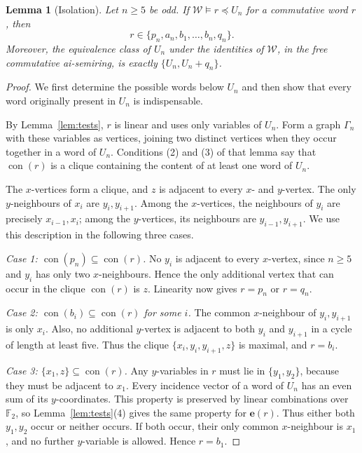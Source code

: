 \documentclass[11pt,reqno]{amsart}
\numberwithin{equation}{section}
\newtheorem{lemma}[theorem]{Lemma}
\theoremstyle{definition}
\theoremstyle{remark}
\DeclareMathOperator{\con}{con}
\newcommand{\W}{\mathcal W}
\newcommand{\F}{\mathbb F_2}
\newcommand{\ivec}[1]{\mathbf e(#1)}
\begin{document}
\begin{lemma}[Isolation]\label{lem:isolation}
Let $n\geq5$ be odd. If $\W\models r\preceq U_n$ for a
commutative word $r$, then
\[
r\in\{p_n,a_n,b_1,\ldots,b_n,q_n\}.
\]
Moreover, the equivalence class of $U_n$ under the identities of
$\W$, in the free commutative ai-semiring, is exactly
$\{U_n,U_n+q_n\}$.
\end{lemma}

\begin{proof}
We first determine the possible words below $U_n$ and then show
that every word originally present in $U_n$ is indispensable.

By Lemma~\ref{lem:tests}, $r$ is linear and uses only variables of
$U_n$. Form a graph $\Gamma_n$ with these variables as vertices,
joining two distinct vertices when they occur together in a word
of $U_n$. Conditions (2) and (3) of that lemma say that
$\con(r)$ is a clique containing the content of at least one word
of $U_n$.

The $x$-vertices form a clique, and $z$ is adjacent to every
$x$- and $y$-vertex. The only $y$-neighbours of $x_i$ are
$y_i,y_{i+1}$. Among the $x$-vertices, the neighbours of $y_i$
are precisely $x_{i-1},x_i$; among the $y$-vertices, its neighbours
are $y_{i-1},y_{i+1}$. We use this description in the following
three cases.

\emph{Case 1: $\con(p_n)\subseteq\con(r)$.}
No $y_i$ is adjacent to every $x$-vertex, since $n\geq5$ and
$y_i$ has only two $x$-neighbours. Hence the only additional
vertex that can occur in the clique $\con(r)$ is $z$.
Linearity now gives $r=p_n$ or $r=q_n$.

\emph{Case 2: $\con(b_i)\subseteq\con(r)$ for some $i$.}
The common $x$-neighbour of $y_i,y_{i+1}$ is only $x_i$.
Also, no additional $y$-vertex is adjacent to both $y_i$ and
$y_{i+1}$ in a cycle of length at least five. Thus the clique
$\{x_i,y_i,y_{i+1},z\}$ is maximal, and $r=b_i$.

\emph{Case 3: $\{x_1,z\}\subseteq\con(r)$.}
Any $y$-variables in $r$ must lie in $\{y_1,y_2\}$, because
they must be adjacent to $x_1$. Every incidence vector of a
word of $U_n$ has an even sum of its $y$-coordinates.
This property is preserved by linear combinations over $\F$,
so Lemma~\ref{lem:tests}(4) gives the same property for
$\ivec{r}$. Thus either both $y_1,y_2$ occur or neither occurs.
If both occur, their only common $x$-neighbour is $x_1$,
and no further $y$-variable is allowed. Hence $r=b_1$.


\end{proof}
\end{document}

